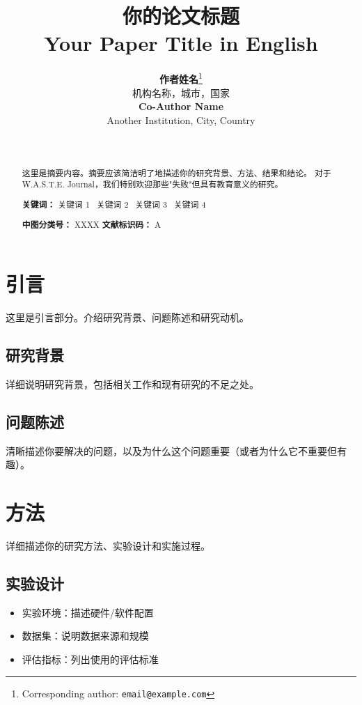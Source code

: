 \documentclass[a4paper,12pt]{article}
\title{%
  \vspace{-2cm}%
  \textbf{\Huge\color{waste-charcoal} 你的论文标题}\\[0.5cm]
  \large\color{waste-gray}Your Paper Title in English%
}
\author{%
  \textbf{作者姓名}\thanks{Corresponding author: \texttt{email@example.com}}\\%
  \small 机构名称，城市，国家\\[0.3cm]%
  \textbf{Co-Author Name}\\%
  \small Another Institution, City, Country%
}
\date{%
  \wastesection{栏目名：填埋场 / Landfill}\\[0.2cm]%
  \submitted{2026-03-08}%
}
\begin{document}
\maketitle
\thispagestyle{plain} %

\begin{abstract}
\noindent 这里是摘要内容。摘要应该简洁明了地描述你的研究背景、方法、结果和结论。
对于 W.A.S.T.E. Journal，我们特别欢迎那些"失败"但具有教育意义的研究。

\vspace{0.5cm}
\noindent\textbf{关键词：} 关键词 1 \textbullet\ 关键词 2 \textbullet\ 关键词 3 \textbullet\ 关键词 4

\vspace{0.5cm}
\noindent\textbf{中图分类号：} XXXX \quad \textbf{文献标识码：} A
\end{abstract}

\section{引言}

这里是引言部分。介绍研究背景、问题陈述和研究动机。

\subsection{研究背景}

详细说明研究背景，包括相关工作和现有研究的不足之处。

\subsection{问题陈述}

清晰描述你要解决的问题，以及为什么这个问题重要（或者为什么它不重要但有趣）。

\section{方法}

详细描述你的研究方法、实验设计和实施过程。

\subsection{实验设计}

\begin{itemize}[leftmargin=*]
  \item 实验环境：描述硬件/软件配置
  \item 数据集：说明数据来源和规模
  \item 评估指标：列出使用的评估标准
\end{itemize}
\end{document}
